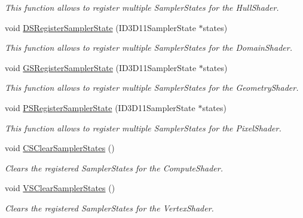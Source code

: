 \begin{DoxyCompactItemize}
\begin{DoxyCompactList}\small\item\em This function allows to register multiple Sampler\-States for the Hull\-Shader. \end{DoxyCompactList}\item 
void \hyperlink{class_osiris_i_1_1_graphics_1_1_shader_1_1_d_x11_shader_a2c5585694c46000fba23f1d969daeb52}{D\-S\-Register\-Sampler\-State} (I\-D3\-D11\-Sampler\-State $\ast$states)
\begin{DoxyCompactList}\small\item\em This function allows to register multiple Sampler\-States for the Domain\-Shader. \end{DoxyCompactList}\item 
void \hyperlink{class_osiris_i_1_1_graphics_1_1_shader_1_1_d_x11_shader_ad94c90c555cf5f304558268d817ad2f8}{G\-S\-Register\-Sampler\-State} (I\-D3\-D11\-Sampler\-State $\ast$states)
\begin{DoxyCompactList}\small\item\em This function allows to register multiple Sampler\-States for the Geometry\-Shader. \end{DoxyCompactList}\item 
void \hyperlink{class_osiris_i_1_1_graphics_1_1_shader_1_1_d_x11_shader_a5d38aac973a1fe9b2f77a702a7616ab2}{P\-S\-Register\-Sampler\-State} (I\-D3\-D11\-Sampler\-State $\ast$states)
\begin{DoxyCompactList}\small\item\em This function allows to register multiple Sampler\-States for the Pixel\-Shader. \end{DoxyCompactList}\item 
void \hyperlink{class_osiris_i_1_1_graphics_1_1_shader_1_1_d_x11_shader_a5fabc9b546ee8168dab24bb5495c2238}{C\-S\-Clear\-Sampler\-States} ()
\begin{DoxyCompactList}\small\item\em Clears the registered Sampler\-States for the Compute\-Shader. \end{DoxyCompactList}\item 
void \hyperlink{class_osiris_i_1_1_graphics_1_1_shader_1_1_d_x11_shader_a146b395e4c9246a8eb0c84f2164f5ea3}{V\-S\-Clear\-Sampler\-States} ()
\begin{DoxyCompactList}\small\item\em Clears the registered Sampler\-States for the Vertex\-Shader. \end{DoxyCompactList}\item 

\end{DoxyCompactItemize}
